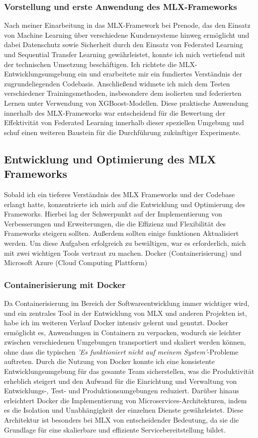 \documentclass[11pt]{article}
\begin{document}
\subsubsection{Vorstellung und erste Anwendung des MLX-Frameworks}
Nach meiner Einarbeitung in das MLX-Framework bei Prenode, das den Einsatz von Machine Learning über verschiedene Kundensysteme hinweg ermöglicht und dabei Datenschutz sowie Sicherheit durch den Einsatz von Federated Learning und Sequential Transfer Learning gewährleistet, konnte ich mich vertiefend mit der technischen Umsetzung beschäftigen. Ich richtete die MLX-Entwicklungsumgebung ein und erarbeitete mir ein fundiertes Verständnis der zugrundeliegenden Codebasis. Anschließend widmete ich mich dem Testen verschiedener Trainingsmethoden, insbesondere dem isolierten und federierten Lernen unter Verwendung von XGBoost-Modellen. Diese praktische Anwendung innerhalb des MLX-Frameworks war entscheidend für die Bewertung der Effektivität von Federated Learning innerhalb dieser speziellen Umgebung und schuf einen weiteren Baustein für die Durchführung zukünftiger Experimente.

\subsection{Entwicklung und Optimierung des MLX Frameworks}
Sobald ich ein tieferes Verständnis des MLX Frameworks und der Codebase erlangt hatte, konzentrierte ich mich auf die Entwicklung und Optimierung des Frameworks. Hierbei lag der Schwerpunkt auf der Implementierung von Verbesserungen und Erweiterungen, die die Effizienz und Flexibilität des Frameworks steigern sollten. Außerdem sollten einige funktionen Aktualisiert werden.
\newline
Um diese Aufgaben erfolgreich zu bewältigen, war es erforderlich, mich mit zwei wichtigen Tools vertraut zu machen. Docker (Containerisierung) und Microsoft Azure (Cloud Computing Plattform)

\subsubsection{Containerisierung mit Docker}
Da Containerisierung im Bereich der Softwareentwicklung immer wichtiger wird, und ein zentrales Tool in der Entwicklung von MLX und anderen Projekten ist, habe ich im weiteren Verlauf Docker intensiv gelernt und genutzt. Docker ermöglicht es, Anwendungen in Containern zu verpacken, wodurch sie leichter zwischen verschiedenen Umgebungen transportiert und skaliert werden können, ohne dass die typischen \textit{'Es funktioniert nicht auf meinem System'}-Probleme auftreten. Durch die Nutzung von Docker konnte ich eine konsistente Entwicklungsumgebung für das gesamte Team sicherstellen, was die Produktivität erheblich steigert und den Aufwand für die Einrichtung und Verwaltung von Entwicklungs-, Test- und Produktionsumgebungen reduziert. Darüber hinaus erleichtert Docker die Implementierung von Microservices-Architekturen, indem es die Isolation und Unabhängigkeit der einzelnen Dienste gewährleistet. Diese Architektur ist besonders bei MLX von entscheidender Bedeutung, da sie die Grundlage für eine skalierbare und effiziente Servicebereitstellung bildet.
\end{document}
